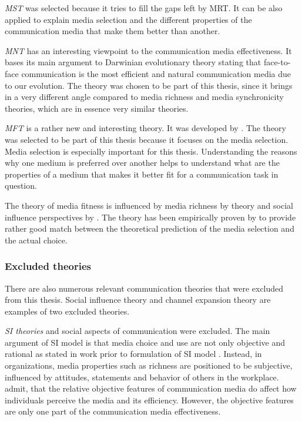 \documentclass[english,12pt,a4paper,pdftex]{article}
\begin{document}
\emph{\Acl{MST}} was selected because it tries to fill the gaps left by \ac{MRT}. It can be also applied to explain media selection and the different properties of the communication media that make them better than another.

\emph{\Acl{MNT}} has an interesting viewpoint to the communication media effectiveness. It bases its main argument to Darwinian evolutionary theory stating that face-to-face communication is the most efficient and natural communication media due to our evolution. The theory was chosen to be part of this thesis, since it brings in a very different angle compared to media richness and media synchronicity theories, which are in essence very similar theories.

\emph{\Acl{MFT}} is a rather new and interesting theory. It was developed by \citet{higa2007}. The theory was selected to be part of this thesis because it focuses on the media selection. Media selection is especially important for this thesis. Understanding the reasons why one medium is preferred over another helps to understand what are the properties of a medium that makes it better fit for a communication task in question.

The theory of media fitness is influenced by media richness by \citet{daft1986} theory and social influence perspectives by \citet{schmitz1991}. The theory has been empirically proven by \citet{gu2011} to provide rather good match between the theoretical prediction of the media selection and the actual choice.

\subsubsection{Excluded theories}

There are also numerous relevant communication theories that were excluded from this thesis. Social influence theory and channel expansion theory are examples of two excluded theories.

\emph{\Ac{SI} theories} and social aspects of communication were excluded. The main argument of \ac{SI} model is that media choice and use are not only objective and rational as stated in work prior to formulation of \ac{SI} model \citep{fulk1987}. Instead, in organizations, media properties such as richness are positioned to be subjective, influenced by attitudes, statements and behavior of others in the workplace. \citet{schmitz1991} admit, that the relative objective features of communication media do affect how individuals perceive the media and its efficiency. However, the objective features are only one part of the communication media effectiveness.
\end{document}
